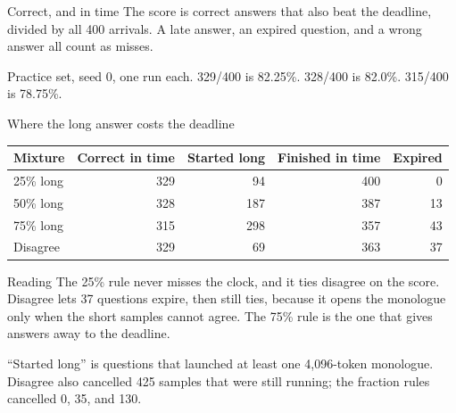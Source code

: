 \documentclass[aspectratio=169,11pt]{beamer}
\newcommand{\src}[1]{\par\vfill\begin{minipage}{0.96\textwidth}\color{muted}\tiny #1\end{minipage}\vspace{-0.2em}}
\begin{document}
\begin{frame}{Correct, and in time}
  The score is correct answers that also beat the deadline, divided by all 400 arrivals.
  A late answer, an expired question, and a wrong answer all count as misses.
  \vspace{0.15em}
  \begin{center}
  \end{center}
  \src{Practice set, seed 0, one run each. 329/400 is 82.25\%. 328/400 is 82.0\%. 315/400 is 78.75\%.}
\end{frame}

\begin{frame}{Where the long answer costs the deadline}
  \small
  \renewcommand{\arraystretch}{1.15}
  \begin{tabular}{@{}l r r r r@{}}
    \toprule
    \textbf{Mixture} & \textbf{Correct in time} & \textbf{Started long} & \textbf{Finished in time} & \textbf{Expired} \\
    \midrule
    25\% long & 329 & 94 & 400 & 0 \\
    50\% long & 328 & 187 & 387 & 13 \\
    75\% long & 315 & 298 & 357 & 43 \\
    Disagree & 329 & 69 & 363 & 37 \\
    \bottomrule
  \end{tabular}
  \vspace{0.35em}
  \begin{block}{Reading}
    \small The 25\% rule never misses the clock, and it ties disagree on the score.
    Disagree lets 37 questions expire, then still ties, because it opens the monologue
    only when the short samples cannot agree. The 75\% rule is the one that gives answers away to the deadline.
  \end{block}
  \src{``Started long'' is questions that launched at least one 4{,}096-token monologue.
  Disagree also cancelled 425 samples that were still running; the fraction rules cancelled 0, 35, and 130.}
\end{frame}
\end{document}
